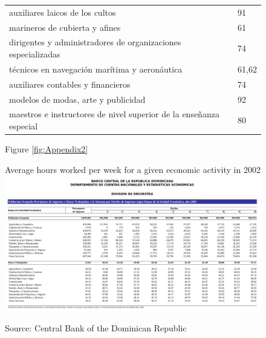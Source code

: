\documentclass[12pt]{article}
\begin{document}
\begin{figure}[H]
\begin{center}
\begin{tabular}{ll}
auxiliares laicos de los cultos & 91\\
marineros de cubierta y afines & 61\\
dirigentes y administradores de organizaciones especializadas & 74\\
t\'{e}cnicos en navegaci\'{o}n mar\'{i}tima y aeron\'{a}utica & 61,62\\
auxiliares contables y financieros & 74\\
modelos de modas, arte y publicidad & 92\\
maestros e instructores de nivel superior de la ense\~{n}anza especial & 80
\end{tabular}

\normalsize
Figure \ref{fig:Appendix2}
\end{center}
\end{figure}

\begin{landscape}
\begin{figure}[H]
\begin{center}
Average hours worked per week for a given economic activity in 2002
\includegraphics[scale=1,keepaspectratio=true]{../Plots/AvgHoursOcc2002.pdf}
\caption{\label{fig:Appendix3}}
Source: Central Bank of the Dominican Republic
\end{center}
\end{figure}
\end{landscape}
\end{document}
